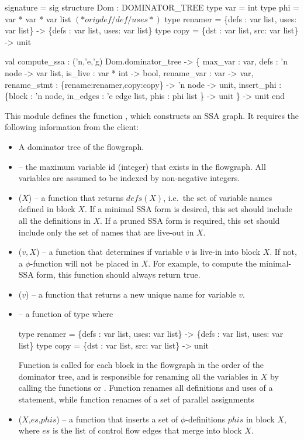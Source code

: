 \begin{SML}
 signature  = sig
   structure Dom : DOMINATOR_TREE
   type var     = int 
   type phi  = var * var * var list $(* orig def/def/uses *)$
   type renamer = \{defs : var list, uses: var list\} ->
                  \{defs : var list, uses: var list\}
   type copy    = \{dst : var list, src: var list\} -> unit

   val compute_ssa : 
       ('n,'e,'g) Dom.dominator_tree ->
       \{ max_var      : var,  
         defs         : 'n node -> var list,
         is_live      : var * int -> bool,
         rename_var   : var -> var,
         rename_stmt  : \{rename:renamer,copy:copy\} -> 'n node -> unit,
         insert_phi   : \{block    : 'n node,
                         in_edges : 'e edge list,
                         phis     : phi list 
                        \} -> unit
       \} -> unit
 end
\end{SML}

This module defines the function , which
constructs an SSA graph.  It requires 
the following information from the client:
\begin{itemize}
\item A dominator tree of the flowgraph.
\item {} -- the maximum variable id (integer) that exists
in the flowgraph.  All variables are assumed to be indexed by non-negative
 integers.
\item {}($X$) -- a function that returns $defs(X)$, 
i.e.~the set of variable names defined in block $X$.
If a minimal SSA form is desired, this set should include all the definitions
in $X$.  If a pruned SSA form is required, this set should
include only the set of names that are live-out in $X$.
\item {}($v,X$) -- a function that determines if
variable $v$ is live-in into block $X$.  If not, a $\phi$-function will
not be placed in $X$.  For example, to compute
the minimal-SSA form, this function should always return true. 
\item {}($v$) -- a function that returns a new 
unique name for variable $v$.   
\item {} -- a function of type
        where
\begin{SML}
   type renamer = \{defs : var list, uses: var list\} ->
                  \{defs : var list, uses: var list\}
   type copy    = \{dst : var list, src: var list\} -> unit
\end{SML}
Function  is called for each block
in the flowgraph in the order of the dominator tree, and
is responsible for renaming all the variables in $X$ by
calling the functions  or .
Function  renames all definitions and uses of
a statement, while function  renames
of a set of parallel assignments
\item {}($X$,$es$,$phis$) --
   a function that inserts a set of 
   $\phi$-definitions $phis$ in block $X$, where $es$
   is the list of control flow edges that merge into block $X$.
\end{itemize}      

